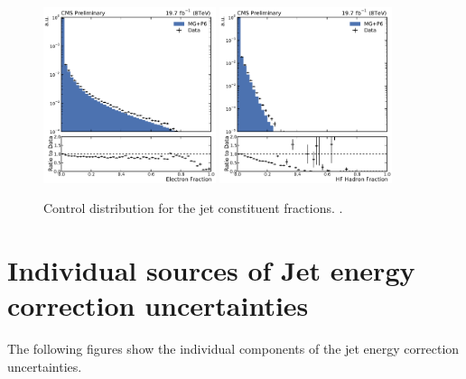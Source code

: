 \begin{figure}[htbp]
    \includegraphics[width=0.45\textwidth]{figures/measurement/jetprop_ef_default.pdf}\hfill
    \includegraphics[width=0.45\textwidth]{figures/measurement/jetprop_hf_emf_default.pdf}
    \caption{Control distribution for the jet constituent fractions. .}
    \label{fig:controlplots:properties}
\end{figure}


\section{Individual sources of Jet energy correction uncertainties}

The following figures show the individual components of the jet energy correction uncertainties.

